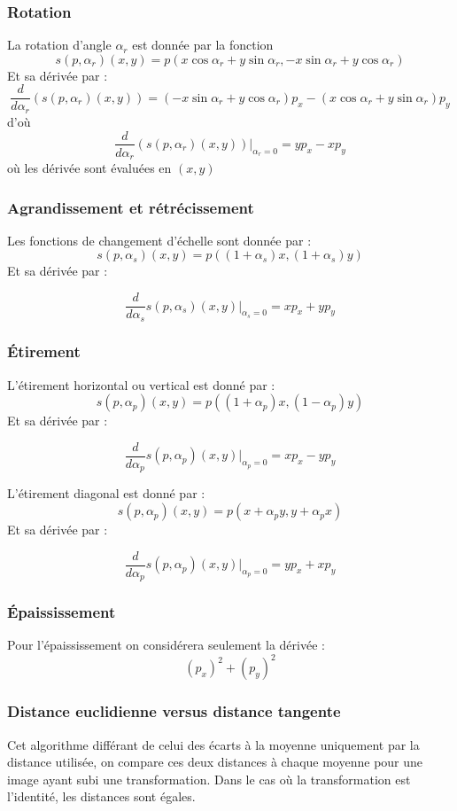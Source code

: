 \documentclass[a4paper,11pt,twoside]{report}
\begin{document}
\subsubsection{Rotation}
La rotation d'angle $\alpha_r$ est donnée par la fonction $$s(p,\alpha_r)(x,y) = p(x\cos\alpha_r+y\sin\alpha_r,-x\sin\alpha_r+y\cos\alpha_r)$$ 
Et sa dérivée par :
$$\frac{d}{d\alpha_r}(s(p,\alpha_r)(x,y))= (-x\sin\alpha_r+y\cos\alpha_r)p_x - (x\cos\alpha_r+y\sin\alpha_r)p_y$$
d'où
$$\frac{d}{d\alpha_r}(s(p,\alpha_r)(x,y))|_{\alpha_r=0}=yp_x-xp_y$$ 
où les dérivée sont évaluées en $(x,y)$

\subsubsection{Agrandissement et rétrécissement}
Les fonctions de changement d'échelle sont donnée par : $$s(p,\alpha_s)(x,y) = p((1+\alpha_s)x,(1+\alpha_s)y)$$  
Et sa dérivée par :

$$\frac{d}{d\alpha_s}s(p,\alpha_s)(x,y)|_{\alpha_s=0}=xp_x+yp_y$$ 

\subsubsection{Étirement}
L'étirement horizontal ou vertical est donné par : $$s(p,\alpha_p)(x,y) = p((1+\alpha_p)x,(1-\alpha_p)y)$$  
Et sa dérivée par :

$$\frac{d}{d\alpha_p}s(p,\alpha_p)(x,y)|_{\alpha_p=0}=xp_x-yp_y$$ 

L'étirement diagonal est donné par : $$s(p,\alpha_p)(x,y) = p(x+\alpha_py,y+\alpha_px)$$  
Et sa dérivée par :

$$\frac{d}{d\alpha_p}s(p,\alpha_p)(x,y)|_{\alpha_p=0}=yp_x+xp_y$$ 

\subsubsection{Épaississement}
Pour l'épaississement on considérera seulement la dérivée \cite{Elden} : $$(p_x)^2+(p_y)^2$$

\subsubsection{Distance euclidienne versus distance tangente}
Cet algorithme différant de celui des écarts à la moyenne uniquement par la distance utilisée, on compare ces deux distances à chaque moyenne pour une image ayant subi une transformation. Dans le cas où la transformation est l'identité, les distances sont égales.
\end{document}
